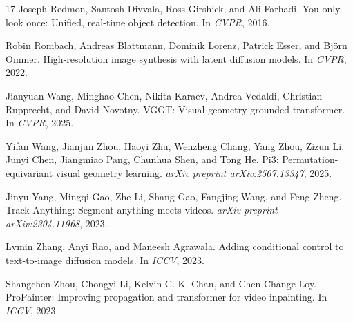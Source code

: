 \documentclass[10pt,twocolumn,letterpaper]{article}
\begin{document}
\begin{thebibliography}{17}
Joseph Redmon, Santosh Divvala, Ross Girshick, and Ali Farhadi.
You only look once: Unified, real-time object detection.
In \textit{CVPR}, 2016.

Robin Rombach, Andreas Blattmann, Dominik Lorenz, Patrick Esser, and Bj\"orn Ommer.
High-resolution image synthesis with latent diffusion models.
In \textit{CVPR}, 2022.

Jianyuan Wang, Minghao Chen, Nikita Karaev, Andrea Vedaldi, Christian Rupprecht, and David Novotny.
VGGT: Visual geometry grounded transformer.
In \textit{CVPR}, 2025.

Yifan Wang, Jianjun Zhou, Haoyi Zhu, Wenzheng Chang, Yang Zhou, Zizun Li, Junyi Chen, Jiangmiao Pang, Chunhua Shen, and Tong He.
Pi3: Permutation-equivariant visual geometry learning.
\textit{arXiv preprint arXiv:2507.13347}, 2025.

Jinyu Yang, Mingqi Gao, Zhe Li, Shang Gao, Fangjing Wang, and Feng Zheng.
Track Anything: Segment anything meets videos.
\textit{arXiv preprint arXiv:2304.11968}, 2023.

Lvmin Zhang, Anyi Rao, and Maneesh Agrawala.
Adding conditional control to text-to-image diffusion models.
In \textit{ICCV}, 2023.

Shangchen Zhou, Chongyi Li, Kelvin C. K. Chan, and Chen Change Loy.
ProPainter: Improving propagation and transformer for video inpainting.
In \textit{ICCV}, 2023.

\end{thebibliography}
\end{document}
